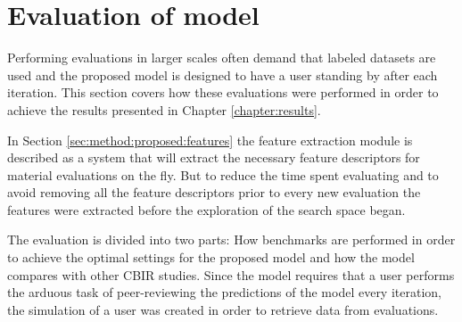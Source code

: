 
\section{Evaluation of model}
\label{sec:meth:evaluation}

Performing evaluations in larger scales often demand that labeled datasets are used and the proposed model is designed to have a user standing by after each iteration. This section covers how these evaluations were performed in order to achieve the results presented in Chapter \ref{chapter:results}.

In Section \ref{sec:method:proposed:features} the feature extraction module is described as a system that will extract the necessary feature descriptors for material evaluations on the fly. But to reduce the time spent evaluating  and to avoid removing all the feature descriptors prior to every new evaluation the features were extracted before the exploration of the search space began. 

The evaluation is divided into two parts: How benchmarks are performed in order to achieve the optimal settings for the proposed model and how the model compares with other CBIR studies. 
Since the model requires that a user performs the arduous task of peer-reviewing the predictions of the model every iteration, the simulation of a user was created in order to retrieve data from evaluations.






